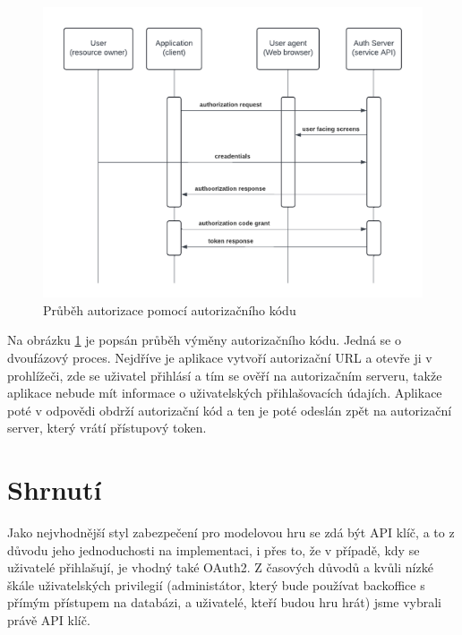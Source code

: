 \begin{figure}[ht]
    \centering
    \includegraphics[width=\textwidth]{figures/Oauth auth flow.pdf}
    \caption[short]{Průběh autorizace pomocí autorizačního kódu}%
    \label{fig:Oauth_auth_flow}
\end{figure}


Na obrázku \ref{fig:Oauth_auth_flow} je popsán průběh výměny autorizačního kódu.
Jedná se o dvoufázový proces.
Nejdříve je aplikace vytvoří autorizační URL a otevře ji v prohlížeči, zde se uživatel přihlásí a tím se ověří na autorizačním serveru, takže aplikace nebude mít informace o uživatelských přihlašovacích údajích. Aplikace poté v odpovědi obdrží autorizační kód a ten je poté odeslán zpět na autorizační server, který vrátí přístupový token.


\section{Shrnutí}
Jako nejvhodnější styl zabezpečení pro modelovou hru se zdá být API klíč, a to z důvodu jeho jednoduchosti na implementaci, i přes to, že v případě, kdy se uživatelé přihlašují, je vhodný také OAuth2. Z časových důvodů a kvůli nízké škále uživatelských privilegií (administátor, který bude používat backoffice s přímým přístupem na databázi, a uživatelé, kteří budou hru hrát) jsme vybrali právě API klíč.

